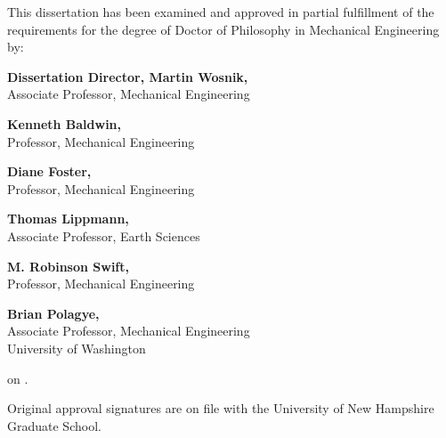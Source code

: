 \newpage
\vspace*{0.75 in}

\begin{singlespace}


\noindent \small{This dissertation has been examined and approved in partial fulfillment of the requirements for the degree of Doctor of Philosophy in Mechanical Engineering by:}
\vspace{0.5in}

\hfill                                       %
\parbox{4in}{                               %
    \textbf{Dissertation Director, Martin Wosnik,}\\ 
    \small{Associate Professor, Mechanical Engineering}
    \vspace{0.2in}
    
    \textbf{Kenneth Baldwin,}\\ 
    \small{Professor, Mechanical Engineering}
    \vspace{0.2in}
    
    \textbf{Diane Foster,}\\  
    \small{Professor, Mechanical Engineering}
    \vspace{0.2in}
    
    \textbf{Thomas Lippmann,}\\
    \small{Associate Professor, Earth Sciences}
    \vspace{0.2in}
    
    \textbf{M. Robinson Swift,}\\ 
    \small{Professor, Mechanical Engineering}
    \vspace{0.2in}
    
    \textbf{Brian Polagye,}\\ 
    \small{Associate Professor, Mechanical Engineering \\ University of Washington}
    \vspace{0.2in}
    
    on .\\
}


\vspace{0.5 in}
\noindent \small{Original approval signatures are on file with the University of New Hampshire Graduate School.}


\end{singlespace}
\vspace*{\fill}
